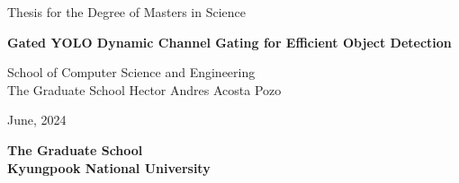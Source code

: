 \begin{titlepage}
    \begin{center}
    	\textmd{\large Thesis for the Degree of Masters in Science}  
        \vfill

        \textbf{\fontsize{21}{11}\selectfont Gated YOLO Dynamic Channel Gating for Efficient Object Detection}  
        \vfill
        
        \textnormal{\large School of Computer Science and Engineering\\ The Graduate School          } 
        \vfill
        \textnormal{\Large Hector Andres Acosta Pozo}
        \vfill
        \vfill
        
        
        \textnormal{\large June, 2024}
        
        \textbf{\Large The Graduate School \\ Kyungpook National University}
        \vfill
    \end{center}
\end{titlepage}